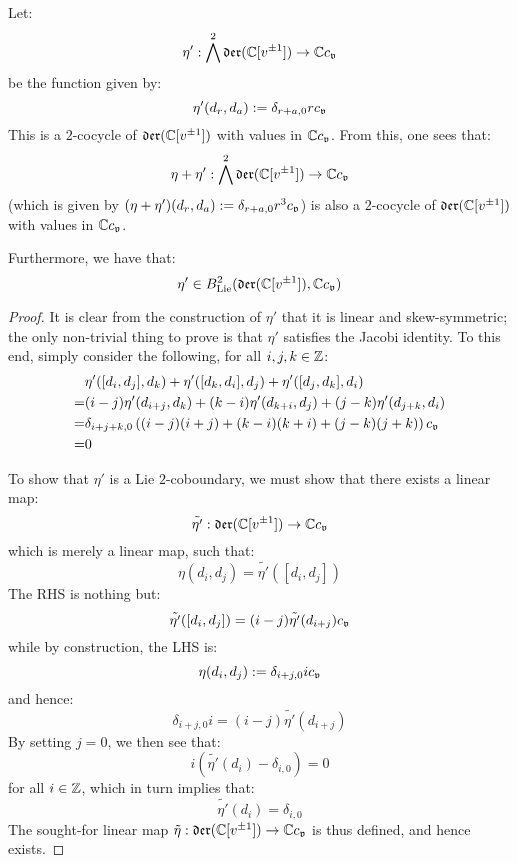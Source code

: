     \begin{proposition} \label{prop: a_virasoro_coboundary}
        Let:
            $$\eta': \bigwedge^2 \mathfrak{der}(\mathbb{C}[v^{\pm 1}]) \to \mathbb{C} c_{\mathfrak{v}}$$
        be the function given by:
            $$\eta'(d_r, d_a) := \delta_{r + a, 0} r c_{\mathfrak{v}}$$
        This is a $2$-cocycle of $\mathfrak{der}(\mathbb{C}[v^{\pm 1}])$ with values in $\mathbb{C} c_{\mathfrak{v}}$. From this, one sees that:
            $$\eta + \eta': \bigwedge^2 \mathfrak{der}(\mathbb{C}[v^{\pm 1}]) \to \mathbb{C} c_{\mathfrak{v}}$$
        (which is given by $(\eta + \eta')(d_r, d_a) := \delta_{r + a, 0} r^3 c_{\mathfrak{v}}$) is also a $2$-cocycle of $\mathfrak{der}(\mathbb{C}[v^{\pm 1}])$ with values in $\mathbb{C} c_{\mathfrak{v}}$. 

        Furthermore, we have that:
            $$\eta' \in B^2_{\mathrm{Lie}}( \mathfrak{der}(\mathbb{C}[v^{\pm 1}]), \mathbb{C} c_{\mathfrak{v}} )$$
    \end{proposition}
        \begin{proof}
            It is clear from the construction of $\eta'$ that it is linear and skew-symmetric; the only non-trivial thing to prove is that $\eta'$ satisfies the Jacobi identity. To this end, simply consider the following, for all $i, j, k \in \mathbb{Z}$:
                $$
                    \begin{aligned}
                        & \eta'([d_i, d_j], d_k) + \eta'([d_k, d_i], d_j) + \eta'([d_j, d_k], d_i)
                        \\
                        = & (i - j) \eta'(d_{i + j}, d_k) + (k - i) \eta'(d_{k + i}, d_j) + (j - k) \eta'(d_{j + k}, d_i)
                        \\
                        = & \delta_{i + j + k, 0} \left( (i - j) (i + j) + (k - i) (k + i) + (j - k) (j + k) \right) c_{\mathfrak{v}}
                        \\
                        = & 0
                    \end{aligned}
                $$
                
            To show that $\eta'$ is a Lie $2$-coboundary, we must show that there exists a linear map:
                $$\tilde{\eta'}: \mathfrak{der}(\mathbb{C}[v^{\pm 1}]) \to \mathbb{C} c_{\mathfrak{v}}$$
            which is merely a linear map, such that:
                $$\eta(d_i, d_j) = \tilde{\eta'}([d_i, d_j])$$
            The RHS is nothing but:
                $$\tilde{\eta'}([d_i, d_j]) = (i - j) \tilde{\eta'}(d_{i + j}) c_{\mathfrak{v}}$$
            while by construction, the LHS is:
                $$\eta(d_i, d_j) := \delta_{i + j, 0} i c_{\mathfrak{v}}$$
            and hence:
                $$\delta_{i + j, 0} i = (i - j) \tilde{\eta'}(d_{i + j})$$
            By setting $j = 0$, we then see that:
                $$i (\tilde{\eta'}(d_i) - \delta_{i, 0}) = 0$$
            for all $i \in \mathbb{Z}$, which in turn implies that:
                $$\tilde{\eta'}(d_i) = \delta_{i, 0}$$
            The sought-for linear map $\tilde{\eta}: \mathfrak{der}(\mathbb{C}[v^{\pm 1}]) \to \mathbb{C} c_{\mathfrak{v}}$ is thus defined, and hence exists.
        \end{proof}
